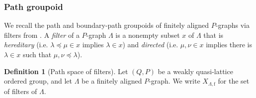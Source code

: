 \documentclass[11pt]{amsart}
\theoremstyle{definition}
\numberwithin{thm}{section}
\numberwithin{equation}{section}
\newtheorem{definition}[thm]{Definition}
\newcommand{\Define}[1]{\emph{#1}}
\newcommand{\F}{\mathrm{f}}
\newcommand{\PS}[2]{X_{#2, #1}}
\begin{document}
\subsubsection{Path groupoid}
\label{sec:path_groupoid}

We recall the path and boundary-path groupoids of finitely aligned $P$-graphs 
via filters from \cite{Jon26}.
A \Define{filter} of a $P$-graph $\Lambda$ is a nonempty subset $x$ of 
$\Lambda$ that is \Define{hereditary} (i.e. $\lambda \preceq \mu \in x$ 
implies $\lambda \in x$) and \Define{directed} (i.e. $\mu,\nu \in x$ implies 
there is $\lambda \in x$ such that $\mu,\nu \preceq \lambda$).

\begin{definition}[Path space of filters]
\label{def:PSfilter}
Let $(Q, P)$ be a weakly quasi-lattice ordered group, and let $\Lambda$ 
be a finitely aligned $P$-graph.
We write $\PS{\F}{\Lambda}$ for the set of filters of $\Lambda$.
\end{definition}
\end{document}
